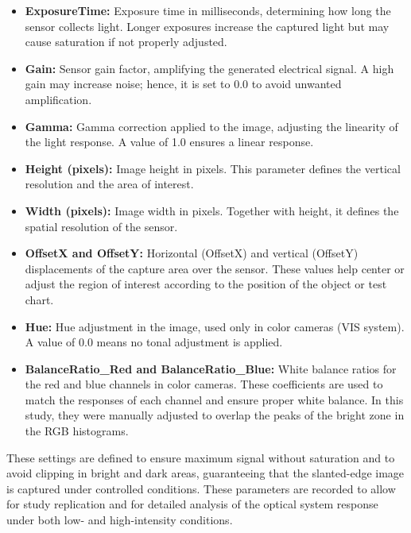 \begin{itemize}
    \item \textbf{ExposureTime:} Exposure time in milliseconds, determining how long the sensor collects light. Longer exposures increase the captured light but may cause saturation if not properly adjusted.

    \item \textbf{Gain:} Sensor gain factor, amplifying the generated electrical signal. A high gain may increase noise; hence, it is set to 0.0 to avoid unwanted amplification.

    \item \textbf{Gamma:} Gamma correction applied to the image, adjusting the linearity of the light response. A value of 1.0 ensures a linear response.

    \item \textbf{Height (pixels):} Image height in pixels. This parameter defines the vertical resolution and the area of interest.

    \item \textbf{Width (pixels):} Image width in pixels. Together with height, it defines the spatial resolution of the sensor.

    \item \textbf{OffsetX and OffsetY:} Horizontal (OffsetX) and vertical (OffsetY) displacements of the capture area over the sensor. These values help center or adjust the region of interest according to the position of the object or test chart.

    \item \textbf{Hue:} Hue adjustment in the image, used only in color cameras (VIS system). A value of 0.0 means no tonal adjustment is applied.

    \item \textbf{BalanceRatio\_Red and BalanceRatio\_Blue:} White balance ratios for the red and blue channels in color cameras. These coefficients are used to match the responses of each channel and ensure proper white balance. In this study, they were manually adjusted to overlap the peaks of the bright zone in the RGB histograms.
\end{itemize}

These settings are defined to ensure maximum signal without saturation and to avoid clipping in bright and dark areas, guaranteeing that the slanted-edge image is captured under controlled conditions. These parameters are recorded to allow for study replication and for detailed analysis of the optical system response under both low- and high-intensity conditions.

